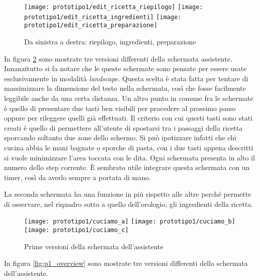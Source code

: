 \begin{figure}[ht]
  \begin{center}
    \texttt{[image: prototipo1/edit\_ricetta\_riepilogo]}
    \texttt{[image: prototipo1/edit\_ricetta\_ingredienti]}
    \texttt{[image: prototipo1/edit\_ricetta\_preparazione]}
    \caption{Da sinistra a destra: riepilogo, ingredienti, preparazione}
    \label{fig:p1_edit_ricetta}
  \end{center}
\end{figure}


In figura \ref{fig:p1_cuciniamo} sono mostrate tre versioni differenti della schermata assistente.
Innanzitutto si fa notare che le queste schermate sono pensate per essere usate esclusivamente in modalità \textit{landscape}.
Questa scelta è stata fatta per tentare di massimizzare la dimensione del testo nella schermata, così che fosse facilmente leggibile anche da una certa distanza.
Un altro punto in comune fra le schermate è quello di presentare due tasti ben visibili per procedere al prossimo passo oppure per rileggere quelli già effettuati.
Il criterio con cui questi tasti sono stati creati è quello di permettere all'utente di spostarsi tra i passaggi della ricetta sporcando soltanto due zone dello schermo.
Si può ipotizzare infatti che chi cucina abbia le mani bagnate o sporche di pasta, con i due tasti appena descritti si vuole minimizzare l'area toccata con le dita.
Ogni schermata presenta in alto il numero dello step corrente.
È sembrato utile integrare questa schermata con un timer, così da averlo sempre a portata di mano.

La seconda schermata ha una funzione in più rispetto alle altre perché permette di osservare, nel riquadro sotto a quello dell'orologio, gli ingredienti della ricetta.

\clearpage
\begin{figure}[ht]
  \begin{center}
    \texttt{[image: prototipo1/cuciamo\_a]}
    \texttt{[image: prototipo1/cuciamo\_b]}
    \texttt{[image: prototipo1/cuciamo\_c]}
    \caption{Prime versioni della schermata dell'assistente}
    \label{fig:p1_cuciniamo}
  \end{center}
\end{figure}

\clearpage
In figura \ref{fig:p1_overview} sono mostrate tre versioni differenti della schermata dell'assistente.

